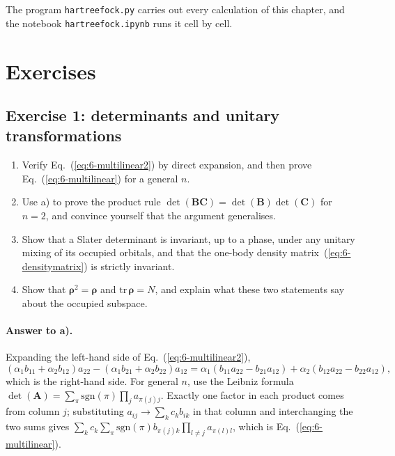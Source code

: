 The program \texttt{hartreefock.py} carries out every calculation of this
chapter, and the notebook \texttt{hartreefock.ipynb} runs it cell by cell.

\section{Exercises}
\label{sec:ch6exercises}

\subsection*{Exercise 1: determinants and unitary transformations}
\label{ex:6-determinants}

\begin{enumerate}
  \item[a)] Verify Eq.~(\ref{eq:6-multilinear2}) by direct expansion, and
  then prove Eq.~(\ref{eq:6-multilinear}) for a general $n$.
  \item[b)] Use a) to prove the product rule
  $\det(\bm{B}\bm{C})=\det(\bm{B})\det(\bm{C})$ for $n=2$, and convince
  yourself that the argument generalises.
  \item[c)] Show that a Slater determinant is invariant, up to a phase, under
  any unitary mixing of its occupied orbitals, and that the one-body density
  matrix~(\ref{eq:6-densitymatrix}) is strictly invariant.
  \item[d)] Show that $\bm{\rho}^2=\bm{\rho}$ and
  $\mathrm{tr}\,\bm{\rho}=N$, and explain what these two statements say about
  the occupied subspace.
\end{enumerate}

\paragraph{Answer to a).}
Expanding the left-hand side of Eq.~(\ref{eq:6-multilinear2}),
\begin{equation}
  (\alpha_1b_{11}+\alpha_2b_{12})a_{22}
  - (\alpha_1b_{21}+\alpha_2b_{22})a_{12}
  = \alpha_1(b_{11}a_{22}-b_{21}a_{12})
  + \alpha_2(b_{12}a_{22}-b_{22}a_{12}),
  \label{eq:6-exa1}
\end{equation}
which is the right-hand side.  For general $n$, use the Leibniz formula
$\det(\bm{A})=\sum_{\pi}\mathrm{sgn}(\pi)\prod_j a_{\pi(j)j}$.  Exactly one
factor in each product comes from column $j$; substituting
$a_{ij}\to\sum_k c_kb_{ik}$ in that column and interchanging the two sums
gives $\sum_k c_k\sum_{\pi}\mathrm{sgn}(\pi)b_{\pi(j)k}\prod_{l\ne j}
a_{\pi(l)l}$, which is Eq.~(\ref{eq:6-multilinear}).

